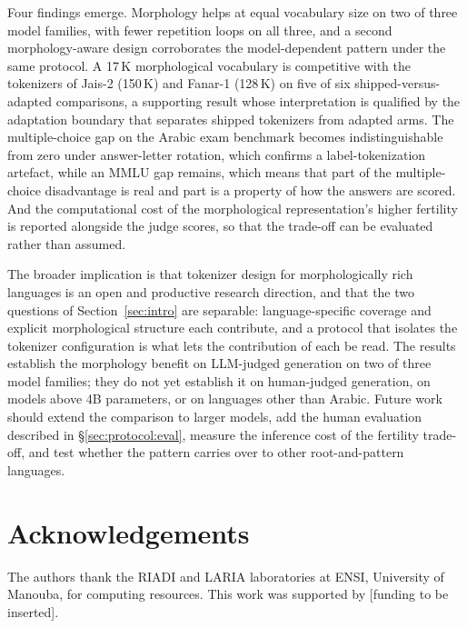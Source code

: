 \documentclass[a4paper,fleqn]{cas-sc}
\begin{document}
Four findings emerge. Morphology helps at equal vocabulary size on two of three model families, with fewer repetition loops on all three, and a second morphology-aware design corroborates the model-dependent pattern under the same protocol. A 17\,K morphological vocabulary is competitive with the tokenizers of Jais-2 (150\,K) and Fanar-1 (128\,K) on five of six shipped-versus-adapted comparisons, a supporting result whose interpretation is qualified by the adaptation boundary that separates shipped tokenizers from adapted arms. The multiple-choice gap on the Arabic exam benchmark becomes indistinguishable from zero under answer-letter rotation, which confirms a label-tokenization artefact, while an MMLU gap remains, which means that part of the multiple-choice disadvantage is real and part is a property of how the answers are scored. And the computational cost of the morphological representation's higher fertility is reported alongside the judge scores, so that the trade-off can be evaluated rather than assumed.

The broader implication is that tokenizer design for morphologically rich languages is an open and productive research direction, and that the two questions of Section~\ref{sec:intro} are separable: language-specific coverage and explicit morphological structure each contribute, and a protocol that isolates the tokenizer configuration is what lets the contribution of each be read. The results establish the morphology benefit on LLM-judged generation on two of three model families; they do not yet establish it on human-judged generation, on models above 4B parameters, or on languages other than Arabic. Future work should extend the comparison to larger models, add the human evaluation described in \S\ref{sec:protocol:eval}, measure the inference cost of the fertility trade-off, and test whether the pattern carries over to other root-and-pattern languages.

\section*{Acknowledgements}

The authors thank the RIADI and LARIA laboratories at ENSI, University of Manouba, for computing resources. This work was supported by [funding to be inserted].

\printcredits



\end{document}
